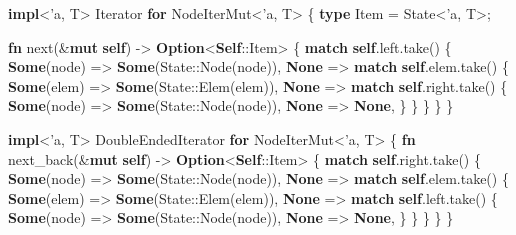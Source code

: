 \documentclass[a4paper,]{book}
\newenvironment{Shaded}{\begin{snugshade}}{\end{snugshade}}
\newcommand{\KeywordTok}[1]{\textcolor[rgb]{0.13,0.29,0.53}{\textbf{{#1}}}}
\newcommand{\OtherTok}[1]{\textcolor[rgb]{0.56,0.35,0.01}{{#1}}}
\newcommand{\NormalTok}[1]{{#1}}
\begin{document}
\begin{Shaded}
\begin{Highlighting}[]
\KeywordTok{impl}\NormalTok{<}\OtherTok{'a}\NormalTok{, T> Iterator }\KeywordTok{for} \NormalTok{NodeIterMut<}\OtherTok{'a}\NormalTok{, T> \{}
    \KeywordTok{type} \NormalTok{Item = State<}\OtherTok{'a}\NormalTok{, T>;}

    \KeywordTok{fn} \NormalTok{next(&}\KeywordTok{mut} \KeywordTok{self}\NormalTok{) -> }\KeywordTok{Option}\NormalTok{<}\KeywordTok{Self}\NormalTok{::Item> \{}
        \KeywordTok{match} \KeywordTok{self}\NormalTok{.left.take() \{}
            \KeywordTok{Some}\NormalTok{(node) => }\KeywordTok{Some}\NormalTok{(State::Node(node)),}
            \KeywordTok{None} \NormalTok{=> }\KeywordTok{match} \KeywordTok{self}\NormalTok{.elem.take() \{}
                \KeywordTok{Some}\NormalTok{(elem) => }\KeywordTok{Some}\NormalTok{(State::Elem(elem)),}
                \KeywordTok{None} \NormalTok{=> }\KeywordTok{match} \KeywordTok{self}\NormalTok{.right.take() \{}
                    \KeywordTok{Some}\NormalTok{(node) => }\KeywordTok{Some}\NormalTok{(State::Node(node)),}
                    \KeywordTok{None} \NormalTok{=> }\KeywordTok{None}\NormalTok{,}
                \NormalTok{\}}
            \NormalTok{\}}
        \NormalTok{\}}
    \NormalTok{\}}
\NormalTok{\}}

\KeywordTok{impl}\NormalTok{<}\OtherTok{'a}\NormalTok{, T> DoubleEndedIterator }\KeywordTok{for} \NormalTok{NodeIterMut<}\OtherTok{'a}\NormalTok{, T> \{}
    \KeywordTok{fn} \NormalTok{next_back(&}\KeywordTok{mut} \KeywordTok{self}\NormalTok{) -> }\KeywordTok{Option}\NormalTok{<}\KeywordTok{Self}\NormalTok{::Item> \{}
        \KeywordTok{match} \KeywordTok{self}\NormalTok{.right.take() \{}
            \KeywordTok{Some}\NormalTok{(node) => }\KeywordTok{Some}\NormalTok{(State::Node(node)),}
            \KeywordTok{None} \NormalTok{=> }\KeywordTok{match} \KeywordTok{self}\NormalTok{.elem.take() \{}
                \KeywordTok{Some}\NormalTok{(elem) => }\KeywordTok{Some}\NormalTok{(State::Elem(elem)),}
                \KeywordTok{None} \NormalTok{=> }\KeywordTok{match} \KeywordTok{self}\NormalTok{.left.take() \{}
                    \KeywordTok{Some}\NormalTok{(node) => }\KeywordTok{Some}\NormalTok{(State::Node(node)),}
                    \KeywordTok{None} \NormalTok{=> }\KeywordTok{None}\NormalTok{,}
                \NormalTok{\}}
            \NormalTok{\}}
        \NormalTok{\}}
    \NormalTok{\}}
\NormalTok{\}}


\end{Highlighting}
\end{Shaded}
\end{document}
